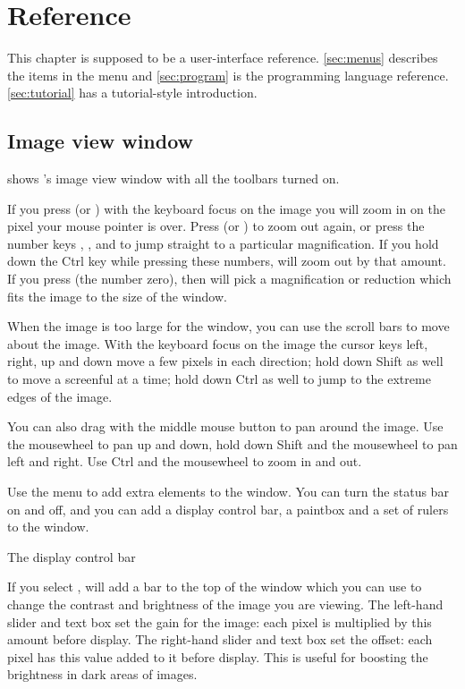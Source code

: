 \chapter{Reference}

\noindent
This chapter is supposed to be a user-interface reference.
\cref{sec:menus} describes the items in the  menu
and \cref{sec:program} is the programming language 
reference. \cref{sec:tutorial} has a tutorial-style introduction.

\section{Image view window}

 shows \nip{}'s image view window with all the toolbars
turned on.

If you press  (or \ct{+}) with the keyboard focus on the image
you will zoom in on the pixel your mouse pointer is over. Press 
(or \ct{-}) to zoom out again, or press the number keys , ,
 and  to jump straight to a particular magnification. If you
hold down the Ctrl key while pressing these numbers, \nip{} will zoom
out by that amount. If you press  (the number zero), then \nip{}
will pick a magnification or reduction which fits the image to the size
of the window.

When the image is too large for the window, you can use the scroll bars
to move about the image. With the keyboard focus on the image the cursor
keys left, right, up and down move a few pixels in each direction; hold down
Shift as well to move a screenful at a time; hold down Ctrl as well to jump
to the extreme edges of the image. 

You can also drag with the middle mouse button to pan around the image. Use
the mousewheel to pan up and down, hold down Shift and the mousewheel to
pan left and right.  Use Ctrl and the mousewheel to zoom in and out.

Use the  menu to add extra elements to the window.  You can turn
the status bar on and off, and you can add a display control bar, a paintbox
and a set of rulers to the window. 

\begin{fig2}
\caption{The display control bar}
\end{fig2}

If you select , \nip{} will add a
bar to the top of the window which you can use to change the contrast and
brightness of the image you are viewing. The left-hand slider and text box
set the gain for the image: each pixel is multiplied by this amount
before display. The right-hand slider and text box set the offset:
each pixel has this value added to it before display. This is useful
for boosting the brightness in dark areas of images.

